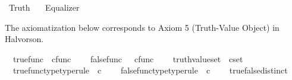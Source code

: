 %
\begin{isabellebody}%
%
%
\isadelimtheory
%
\endisadelimtheory
%
\isatagtheory
{}\isamarkupfalse%
\ Truth\isanewline
\ \ \ Equalizer\isanewline
{}%
\endisatagtheory
{\isafoldtheory}%
%
\isadelimtheory
%
\endisadelimtheory
%
\isadelimdocument
%
\endisadelimdocument
%
\isatagdocument
%
\isamarkuptrue%
%
\endisatagdocument
{\isafolddocument}%
%
\isadelimdocument
%
\endisadelimdocument
%
\begin{isamarkuptext}%
The axiomatization below corresponds to Axiom 5 (Truth-Value Object) in Halvorson.%
\end{isamarkuptext}\isamarkuptrue%
\isamarkupfalse%
\isanewline
\ \ true{\isacharunderscore}{\kern0pt}func\ {\isacharcolon}{\kern0pt}{\isacharcolon}{\kern0pt}\ {\isachardoublequoteopen}cfunc{\isachardoublequoteclose}\ {\isacharparenleft}{\kern0pt}{\isachardoublequoteopen}{\isasymt}{\isachardoublequoteclose}{\isacharparenright}{\kern0pt}\ \isanewline
\ \ false{\isacharunderscore}{\kern0pt}func\ \ {\isacharcolon}{\kern0pt}{\isacharcolon}{\kern0pt}\ {\isachardoublequoteopen}cfunc{\isachardoublequoteclose}\ {\isacharparenleft}{\kern0pt}{\isachardoublequoteopen}{\isasymf}{\isachardoublequoteclose}{\isacharparenright}{\kern0pt}\ \isanewline
\ \ truth{\isacharunderscore}{\kern0pt}value{\isacharunderscore}{\kern0pt}set\ {\isacharcolon}{\kern0pt}{\isacharcolon}{\kern0pt}\ {\isachardoublequoteopen}cset{\isachardoublequoteclose}\ {\isacharparenleft}{\kern0pt}{\isachardoublequoteopen}{\isasymOmega}{\isachardoublequoteclose}{\isacharparenright}{\kern0pt}\isanewline
{}\isanewline
\ \ true{\isacharunderscore}{\kern0pt}func{\isacharunderscore}{\kern0pt}type{\isacharbrackleft}{\kern0pt}type{\isacharunderscore}{\kern0pt}rule{\isacharbrackright}{\kern0pt}{\isacharcolon}{\kern0pt}\ {\isachardoublequoteopen}{\isasymt}\ {\isasymin}\isactrlsub c\ {\isasymOmega}{\isachardoublequoteclose}\ \isanewline
\ \ false{\isacharunderscore}{\kern0pt}func{\isacharunderscore}{\kern0pt}type{\isacharbrackleft}{\kern0pt}type{\isacharunderscore}{\kern0pt}rule{\isacharbrackright}{\kern0pt}{\isacharcolon}{\kern0pt}\ {\isachardoublequoteopen}{\isasymf}\ {\isasymin}\isactrlsub c\ {\isasymOmega}{\isachardoublequoteclose}\ \isanewline
\ \ true{\isacharunderscore}{\kern0pt}false{\isacharunderscore}{\kern0pt}distinct{\isacharcolon}{\kern0pt}\ {\isachardoublequoteopen}{\isasymt}\ {\isasymnoteq}\ {\isasymf}{\isachardoublequoteclose}\ \isanewline

\end{isabellebody}
